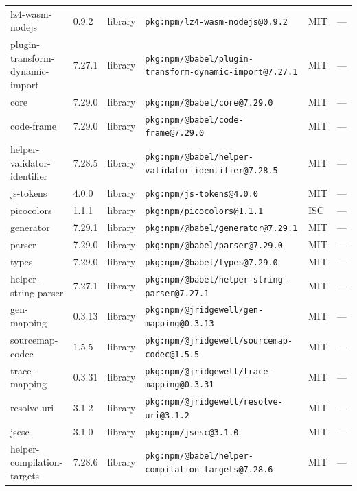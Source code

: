 \documentclass[11pt,a4paper]{article}
\begin{document}
\begin{longtable}{|p{4cm}|p{2cm}|p{1.6cm}|p{5cm}|p{1.5cm}|p{3.5cm}|}
\raggedright lz4-wasm-nodejs & 0.9.2 & library & \small\texttt{pkg:npm/lz4-wasm-nodejs@0.9.2} & MIT & \small — \\
\raggedright plugin-transform-dynamic-import & 7.27.1 & library & \small\texttt{pkg:npm/@babel/plugin-transform-dynamic-import@7.27.1} & MIT & \small — \\
\raggedright core & 7.29.0 & library & \small\texttt{pkg:npm/@babel/core@7.29.0} & MIT & \small — \\
\raggedright code-frame & 7.29.0 & library & \small\texttt{pkg:npm/@babel/code-frame@7.29.0} & MIT & \small — \\
\raggedright helper-validator-identifier & 7.28.5 & library & \small\texttt{pkg:npm/@babel/helper-validator-identifier@7.28.5} & MIT & \small — \\
\raggedright js-tokens & 4.0.0 & library & \small\texttt{pkg:npm/js-tokens@4.0.0} & MIT & \small — \\
\raggedright picocolors & 1.1.1 & library & \small\texttt{pkg:npm/picocolors@1.1.1} & ISC & \small — \\
\raggedright generator & 7.29.1 & library & \small\texttt{pkg:npm/@babel/generator@7.29.1} & MIT & \small — \\
\raggedright parser & 7.29.0 & library & \small\texttt{pkg:npm/@babel/parser@7.29.0} & MIT & \small — \\
\raggedright types & 7.29.0 & library & \small\texttt{pkg:npm/@babel/types@7.29.0} & MIT & \small — \\
\raggedright helper-string-parser & 7.27.1 & library & \small\texttt{pkg:npm/@babel/helper-string-parser@7.27.1} & MIT & \small — \\
\raggedright gen-mapping & 0.3.13 & library & \small\texttt{pkg:npm/@jridgewell/gen-mapping@0.3.13} & MIT & \small — \\
\raggedright sourcemap-codec & 1.5.5 & library & \small\texttt{pkg:npm/@jridgewell/sourcemap-codec@1.5.5} & MIT & \small — \\
\raggedright trace-mapping & 0.3.31 & library & \small\texttt{pkg:npm/@jridgewell/trace-mapping@0.3.31} & MIT & \small — \\
\raggedright resolve-uri & 3.1.2 & library & \small\texttt{pkg:npm/@jridgewell/resolve-uri@3.1.2} & MIT & \small — \\
\raggedright jsesc & 3.1.0 & library & \small\texttt{pkg:npm/jsesc@3.1.0} & MIT & \small — \\
\raggedright helper-compilation-targets & 7.28.6 & library & \small\texttt{pkg:npm/@babel/helper-compilation-targets@7.28.6} & MIT & \small — \\

\end{longtable}
\end{document}
